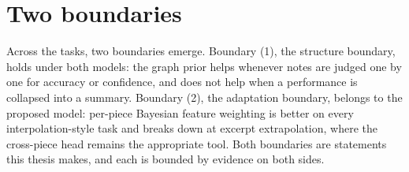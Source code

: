\section{Two boundaries}\label{sec:boundary}
Across the tasks, two boundaries emerge. Boundary (1), the structure
boundary, holds under both models: the graph prior helps whenever notes are
judged one by one for accuracy or confidence, and does not help when a
performance is collapsed into a summary. Boundary (2), the adaptation
boundary, belongs to the proposed model: per-piece Bayesian feature weighting
is better on every interpolation-style task and breaks down at excerpt
extrapolation, where the cross-piece head remains the appropriate tool. Both
boundaries are statements this thesis makes, and each is bounded by evidence
on both sides.

